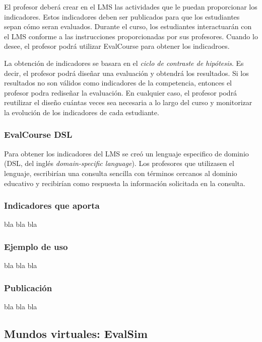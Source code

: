 El profesor deberá crear en el LMS las actividades que le puedan proporcionar los indicadores. Estos indicadores deben ser publicados para que los estudiantes sepan cómo seran evaluados. Durante el curso, los estudiantes interactuarán con el LMS conforme a las instrucciones proporcionadas por sus profesores. Cuando lo desee, el profesor podrá utilizar EvalCourse para obtener los indicadroes.

La obtención de indicadores se basara en el \emph{ciclo de contraste de hipótesis}. Es decir, el profesor podrá diseñar una evaluación y obtendrá los resultados. Si los resultados no son válidos como indicadores de la competencia, entonces el profesor podra rediseñar la evaluación. En cualquier caso, el profesor podrá reutilizar el diseño cuántas veces sea necesaria a lo largo del curso y monitorizar la evolución de los indicadores de cada estudiante.

\subsubsection{EvalCourse DSL}

Para obtener los indicadores del LMS se creó un lenguaje especifico de dominio (DSL, del inglés \emph{domain-specific language}). Los profesores que utilizasen el lenguaje, escribirían una consulta sencilla con términos cercanos al dominio educativo y recibirían como respuesta la información solicitada en la consulta. 

\subsubsection{Indicadores que aporta}

bla bla bla

\subsubsection{Ejemplo de uso}

bla bla bla

\subsubsection{Publicación}

bla bla bla

\subsection{Mundos virtuales: EvalSim}


